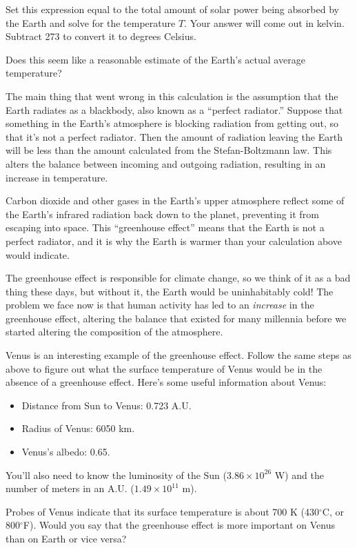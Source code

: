 Set this expression equal to the total amount of solar power
being absorbed by the Earth and solve for the temperature $T$.
Your answer will come out in kelvin.  Subtract 273 to convert 
it to degrees Celsius.

\vskip 1.5in

Does this seem like a reasonable estimate of the Earth's 
actual average temperature?

\vskip 1in

The main thing that went wrong in this calculation is the assumption
that the Earth radiates as a blackbody, also known
as a  ``perfect radiator.''
Suppose that something in the Earth's atmosphere is blocking
radiation from getting out, so that it's not a perfect radiator.
Then the amount of radiation leaving the Earth will be less than 
the amount calculated from the Stefan-Boltzmann law.  This
alters the balance between incoming and outgoing radiation, resulting
in an increase in temperature.

Carbon dioxide and other gases in the Earth's upper atmosphere reflect some of
the Earth's infrared radiation back down to the planet, preventing it from
escaping into space.  This ``greenhouse effect'' means that
the Earth is not a perfect radiator, and it is why
the Earth is warmer than your calculation above would indicate.

The greenhouse effect is responsible for climate change, so
we think of it as a bad thing these days,
but without it, the Earth would be uninhabitably cold!  The
problem we face now is that human activity has led to
an {\it increase} in the
greenhouse effect, altering the balance that existed for 
many millennia before we started altering the composition of the
atmosphere.

Venus is an interesting example of the greenhouse effect.
Follow the same steps as above to figure out what
the surface temperature of Venus would be in the absence of
a greenhouse effect.  Here's some useful information about Venus:

\begin{itemize}
\item Distance from Sun to Venus: 0.723 A.U.
\item Radius of Venus: 6050 km.
\item Venus's albedo: 0.65.
\end{itemize}

You'll also need to know the luminosity of the Sun ($3.86\times 10^{26}$ W)
and the number of meters in an A.U. ($1.49\times 10^{11}$ m).

\vfil

Probes of Venus indicate that its surface temperature is about 700 K
(430$^\circ$C, or 800$^\circ$F).  Would you say that the
greenhouse effect is more important on Venus than on Earth or 
vice versa?

\vskip 1in
\eject




